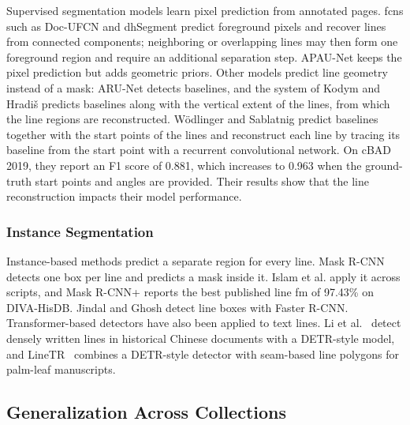 Supervised segmentation models learn pixel prediction from annotated pages. \Glspl{fcn} such as Doc-UFCN \cite{boillet2021docufcn} and dhSegment \cite{oliveira2018dhsegment} predict foreground pixels and recover lines from connected components; neighboring or overlapping lines may then form one foreground region and require an additional separation step. APAU-Net \cite{Beghoura2026-dp} keeps the pixel prediction but adds geometric priors. Other models predict line geometry instead of a mask: ARU-Net \cite{gruning2019arunet} detects baselines, and the system of Kodym and Hradi\v{s} \cite{kodym2021page} predicts baselines along with the vertical extent of the lines, from which the line regions are reconstructed. Wödlinger and Sablatnig \cite{wodlinger2021baseline} predict baselines together with the start points of the lines and reconstruct each line by tracing its baseline from the start point with a recurrent convolutional network. On cBAD 2019, they report an F1 score of 0.881, which increases to 0.963 when the ground-truth start points and angles are provided. Their results show that the line reconstruction impacts their model performance.

\subsubsection{Instance Segmentation}
\label{sec:related-detection}

Instance-based methods predict a separate region for every line. Mask R-CNN \cite{he2017maskrcnn} detects one box per line and predicts a mask inside it. Islam et al. \cite{Textline_maskrcnn} apply it across scripts, and Mask R-CNN+ \cite{signals3030032} reports the best published line \gls{fm} of 97.43\% on DIVA-HisDB. Jindal and Ghosh \cite{jindal2023fasterrcnn} detect line boxes with Faster R-CNN. Transformer-based detectors have also been applied to text lines. Li et al.~\cite{li2023dtdt} detect densely written lines in historical Chinese documents with a DETR-style model, and LineTR~\cite{agrawal2024linetr} combines a DETR-style detector with seam-based line polygons for palm-leaf manuscripts.

\subsection{Generalization Across Collections}

